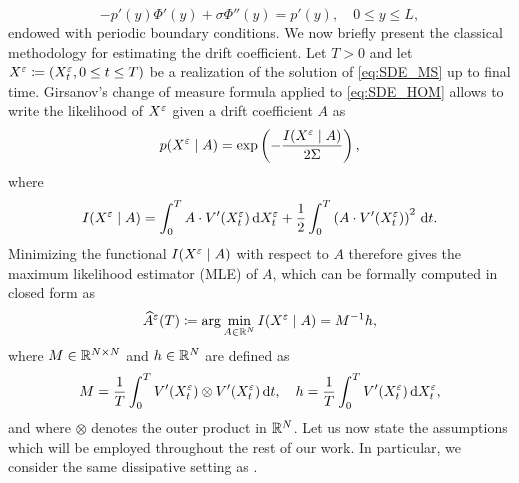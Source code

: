 \documentclass[10pt]{article}
\begin{document}
\begin{equation}
	-p'(y)\Phi'(y) + \sigma \Phi''(y) = p'(y), \quad 0 \leq y \leq L,
\end{equation}
endowed with periodic boundary conditions. 
We now briefly present the classical methodology for estimating the drift coefficient. Let $T > 0$ and let $X^\varepsilon \coloneqq (X^\varepsilon_t, 0\leq t \leq T)$ be a realization of the solution of \eqref{eq:SDE_MS} up to final time. Girsanov's change of measure formula applied to \eqref{eq:SDE_HOM} allows to write the likelihood of $X^\varepsilon$ given a drift coefficient $A$ as
\begin{equation}\label{eq:Likelihood}
p(X^\varepsilon \mid A) = \exp\left(-\frac{I(X^\varepsilon\mid A)}{2\Sigma} \right), 
\end{equation}
where 
\begin{equation}
I(X^\varepsilon \mid A) = \int_0^T A \cdot V'(X^\varepsilon_t) \,\mathrm{d} X^\varepsilon_t + \frac12 \int_0^T \left( A \cdot V'(X^\varepsilon_t) \right)^2 \,\mathrm{d} t.
\end{equation}
Minimizing the functional $I(X^\varepsilon \mid A)$ with respect to $A$ therefore gives the maximum likelihood estimator (MLE) of $A$, which can be formally computed in closed form as
\begin{equation}\label{eq:MLE}
	\widehat A^\varepsilon(T) \coloneqq \arg \min_{A \in \mathbb{R}^N} I(X^\varepsilon \mid A) = M^{-1}h,
\end{equation}
where $M\in\mathbb{R}^{N\times N}$ and $h\in\mathbb{R}^N$ are defined as
\begin{equation}\label{eq:MandH}
M = \frac1T \int_0^T V'(X^\varepsilon_t) \otimes V'(X^\varepsilon_t) \,\mathrm{d} t, \quad h = \frac1T \int_0^T V'(X^\varepsilon_t) \,\mathrm{d} X^\varepsilon_t,
\end{equation}
and where $\otimes$ denotes the outer product in $\mathbb{R}^N$. Let us now state the assumptions which will be employed throughout the rest of our work. In particular, we consider the same dissipative setting as \cite[Assumption 3.1]{PaS07}.
\end{document}
